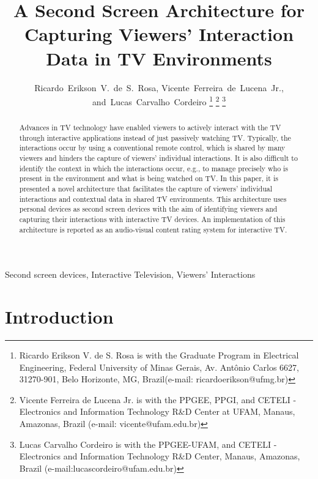 \documentclass[journal]{IEEEtran}
\begin{document}
\title{A Second Screen Architecture for Capturing Viewers' Interaction Data in TV Environments}
\author{Ricardo~Erikson~V.~de~S.~Rosa, 
	Vicente~Ferreira~de~Lucena~Jr.,
	and~Lucas~Carvalho~Cordeiro
\thanks{Ricardo Erikson V. de S. Rosa is with the Graduate Program in Electrical Engineering, Federal University of Minas Gerais, Av. Antônio Carlos 6627, 31270-901, Belo Horizonte, MG, Brazil(e-mail: ricardoerikson@ufmg.br)}%
\thanks{Vicente Ferreira de Lucena Jr. is with the PPGEE, PPGI, and CETELI - Electronics and Information Technology R\&D Center at UFAM, Manaus, Amazonas, Brazil (e-mail: vicente@ufam.edu.br)}%
\thanks{Lucas Carvalho Cordeiro is with the PPGEE-UFAM, and CETELI - Electronics and Information Technology R\&D Center, Manaus, Amazonas, Brazil (e-mail:lucascordeiro@ufam.edu.br)}}

\maketitle

\begin{abstract}
Advances in TV technology have enabled viewers to actively interact with the TV through interactive applications instead of just passively watching TV. Typically, the interactions occur by using a conventional remote control, which is shared by many viewers and hinders the capture of viewers' individual interactions. It is also difficult to identify the context in which the interactions occur, e.g., to manage precisely who is present in the environment and what is being watched on TV. In this paper, it is presented a novel architecture that facilitates the capture of viewers' individual interactions and contextual data in shared TV environments. This architecture uses personal devices as second screen devices with the aim of identifying viewers and capturing their interactions with interactive TV devices. An implementation of this architecture is reported as an audio-visual content rating system for interactive TV.
\end{abstract}

\begin{IEEEkeywords}
Second screen devices, Interactive Television, Viewers' Interactions
\end{IEEEkeywords}

\IEEEpeerreviewmaketitle

\section{Introduction}
\end{document}
